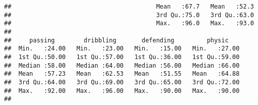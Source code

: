 \documentclass[
]{article}
\newenvironment{Shaded}{\begin{snugshade}}{\end{snugshade}}
\newcommand{\FunctionTok}[1]{\textcolor[rgb]{0.13,0.29,0.53}{\textbf{#1}}}
\newcommand{\NormalTok}[1]{#1}
\newcommand{\OtherTok}[1]{\textcolor[rgb]{0.56,0.35,0.01}{#1}}
\newcommand{\SpecialCharTok}[1]{\textcolor[rgb]{0.81,0.36,0.00}{\textbf{#1}}}
\newcommand{\StringTok}[1]{\textcolor[rgb]{0.31,0.60,0.02}{#1}}
\begin{document}
\begin{verbatim}
##                                        Mean   :67.7   Mean   :52.3  
##                                        3rd Qu.:75.0   3rd Qu.:63.0  
##                                        Max.   :96.0   Max.   :93.0  
##                                                                     
##     passing        dribbling       defending         physic     
##  Min.   :24.00   Min.   :23.00   Min.   :15.00   Min.   :27.00  
##  1st Qu.:50.00   1st Qu.:57.00   1st Qu.:36.00   1st Qu.:59.00  
##  Median :58.00   Median :64.00   Median :56.00   Median :66.00  
##  Mean   :57.23   Mean   :62.53   Mean   :51.55   Mean   :64.88  
##  3rd Qu.:64.00   3rd Qu.:69.00   3rd Qu.:65.00   3rd Qu.:72.00  
##  Max.   :92.00   Max.   :96.00   Max.   :90.00   Max.   :90.00  
## 
\end{verbatim}

\begin{Shaded}
\end{Shaded}
\end{document}
